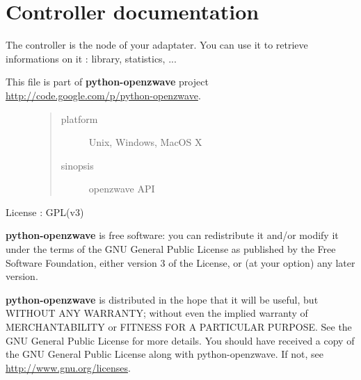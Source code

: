\documentclass[letterpaper,10pt,english]{sphinxmanual}
\begin{document}
\section{Controller documentation}
\label{controller:controller-documentation}\label{controller::doc}
The controller is the node of your adaptater. You can use it to retrieve
informations on it : library, statistics, ...
\label{controller:module-openzwave.controller}\label{controller:module-openzwave.controller}\label{controller:openzwavecontroller}\begin{description}
\item[{This file is part of \textbf{python-openzwave} project \href{http://code.google.com/p/python-openzwave}{http://code.google.com/p/python-openzwave}.}] \leavevmode\begin{quote}\begin{description}
\item[{platform}] \leavevmode
Unix, Windows, MacOS X

\item[{sinopsis}] \leavevmode
openzwave API

\end{description}\end{quote}

\end{description}

License : GPL(v3)

\textbf{python-openzwave} is free software: you can redistribute it and/or modify
it under the terms of the GNU General Public License as published by
the Free Software Foundation, either version 3 of the License, or
(at your option) any later version.

\textbf{python-openzwave} is distributed in the hope that it will be useful,
but WITHOUT ANY WARRANTY; without even the implied warranty of
MERCHANTABILITY or FITNESS FOR A PARTICULAR PURPOSE. See the
GNU General Public License for more details.
You should have received a copy of the GNU General Public License
along with python-openzwave. If not, see \href{http://www.gnu.org/licenses}{http://www.gnu.org/licenses}.
\end{document}
